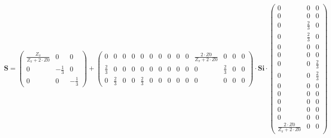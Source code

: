 \[ \mathbf{S} = \left(\begin{smallmatrix} \frac{Z_{\pi}}{Z_{\pi}+2\cdot Z0} & 0 & 0 \\ 0 & -\frac{1}{3} & 0 \\ 0 & 0 & -\frac{1}{3} \end{smallmatrix}\right) + \left(\begin{smallmatrix} 0 & 0 & 0 & 0 & 0 & 0 & 0 & 0 & 0 & 0 & \frac{2\cdot Z0}{Z_{\pi}+2\cdot Z0} & 0 & 0 & 0 \\ \frac{2}{3} & 0 & 0 & 0 & 0 & 0 & 0 & 0 & 0 & 0 & 0 & \frac{2}{3} & 0 & 0 \\ 0 & \frac{2}{3} & 0 & 0 & \frac{2}{3} & 0 & 0 & 0 & 0 & 0 & 0 & 0 & 0 & 0 \end{smallmatrix}\right) \cdot \mathbf{Si} \cdot\left(\begin{smallmatrix} 0 & 0 & 0 \\ 0 & 0 & 0 \\ 0 & \frac{2}{3} & 0 \\ 0 & \frac{2}{3} & 0 \\ 0 & 0 & 0 \\ 0 & 0 & 0 \\ 0 & 0 & \frac{2}{3} \\ 0 & 0 & \frac{2}{3} \\ 0 & 0 & 0 \\ 0 & 0 & 0 \\ 0 & 0 & 0 \\ 0 & 0 & 0 \\ 0 & 0 & 0 \\ \frac{2\cdot Z0}{Z_{\pi}+2\cdot Z0} & 0 & 0 \end{smallmatrix}\right) \]
